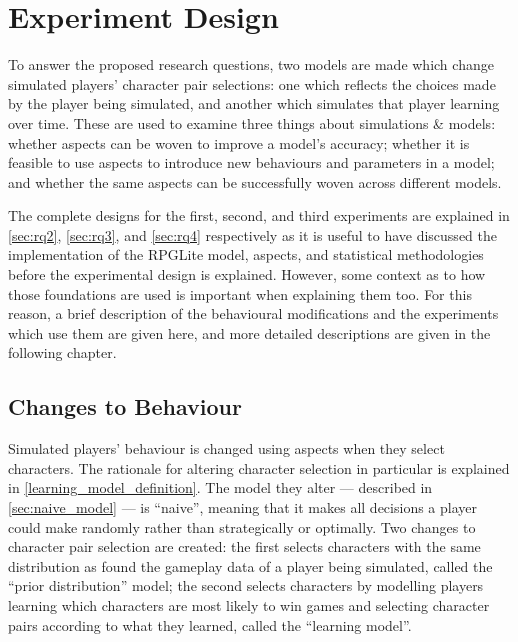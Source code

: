 \section{Experiment Design}
\label{experiment_design_sec_models_and_experiments}

To answer the proposed research questions, two models are made which change
simulated players' character pair selections: one which reflects the choices
made by the player being simulated, and another which simulates that player
learning over time. These are used to examine three things about
\aspectoriented{} simulations \& models: whether aspects can be woven to improve
a model's accuracy; whether it is feasible to use aspects to introduce new
behaviours and parameters in a model; and whether the same aspects can be
successfully woven across different models.


The complete designs for the first, second, and third experiments are explained
in \cref{sec:rq2}, \cref{sec:rq3}, and \cref{sec:rq4} respectively as it is
useful to have discussed the implementation of the RPGLite model, aspects, and
statistical methodologies before the experimental design is explained. However,
some context as to how those foundations are used is important when explaining
them too. For this reason, a brief description of the behavioural modifications
and the experiments which use them are given here, and more detailed
descriptions are given in the following chapter.

\subsection{Changes to Behaviour}
\label{early_behaviour_change_descriptions}

Simulated players' behaviour is changed using aspects when they select
characters. The rationale for altering character selection in particular is
explained in \cref{learning_model_definition}. The model they alter ---
described in \cref{sec:naive_model} --- is ``naive'', meaning that it makes all
decisions a player could make randomly rather than strategically or optimally.
Two changes to character pair selection are created: the first selects
characters with the same distribution as found the gameplay data of a player
being simulated, called the ``prior distribution'' model; the second selects
characters by modelling players learning which characters are most likely to win
games and selecting character pairs according to what they learned, called the
``learning model''.

